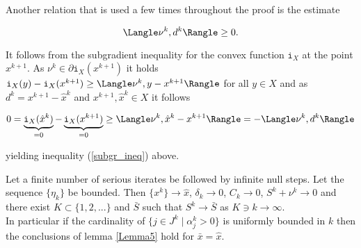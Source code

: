 Another relation that is used a few times throughout the proof is the estimate

\begin{equation}
	\Langle \nu^k, d^k \Rangle \geq 0.
\label{subgr_ineq}
\end{equation}

It follows from the subgradient inequality for the convex function \(\mathtt{i}_X\) at the point \(x^{k+1}\). As \(\nu^k \in \partial \mathtt{i}_X(x^{k+1})\) it holds \(\mathtt{i}_X(y)-\mathtt{i}_X(x^{k+1}) \geq \Langle\nu^k,y-x^{k+1}\Rangle\) for all \(y \in X\) and as \(d^k = x^{k+1}-\hat{x}^k\) and \(x^{k+1}, \hat{x}^k \in X\) it follows

\[ 0 = \underbrace{\mathtt{i}_X(\hat{x}^k)}_{=0} - \underbrace{\mathtt{i}_X(x^{k+1})}_{=0} \geq \Langle \nu^k,\hat{x}^k-x^{k+1}\Rangle = -\Langle \nu^k,d^k\Rangle \]

yielding inequality (\ref{subgr_ineq}) above.


\begin{theorem} 
	Let a finite number of serious iterates be followed by infinite null steps. Let the sequence \(\{\eta_k\}\) be bounded.
	Then \(\{x^k\} \to \hat{x}\), \(\delta_k \to 0\), \(C_k \to 0\), \(S^k + \nu^k \to 0\) and there exist \(K\subset \{1,2,...\}\) and \(\bar{S}\) such that \(S^k \to \bar{S}\) as \(K \ni k \to \infty\). \\
	In particular if the cardinality of \(\{j \in J^k\mid \alpha_j^k > 0 \}\) is uniformly bounded in \(k\) then the conclusions of lemma \ref{Lemma5} hold for \(\bar{x} = \hat{x}\). 
\end{theorem}

